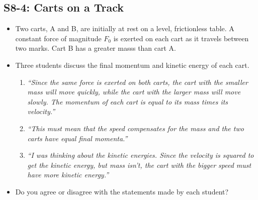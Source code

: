 \documentclass[]{article}
\begin{document}
\begin{PresentSpace}
\section*{S8-4: Carts on a Track}
\vspace{-10pt}
\begin{itemize}
	\large
	\item Two carts, A and B, are initially at rest on a level, frictionless table. A constant force of magnitude $F_{0}$ is exerted on each cart as it travels between two marks. Cart B has a greater masss than cart A.
	\begin{center}
	\end{center}
	\item Three students discuss the final momentum and kinetic energy of each cart.
	\begin{enumerate}[(1)]
		\item \textit{``Since the same force is exerted on both carts, the cart with the smaller mass will move quickly, while the cart with the larger mass will move slowly. The momentum of each cart is equal to its mass times its velocity.''}
		\item \textit{``This must mean that the speed compensates for the mass and the two carts have equal final momenta.''}
		\item \textit{``I was thinking about the kinetic energies. Since the velocity is squared to get the kinetic energy, but mass isn't, the cart with the bigger speed must have more kinetic energy.''}
	\end{enumerate}
	\item Do you agree or disagree with the statements made by each student?

\end{itemize}
\end{PresentSpace}
\end{document}
